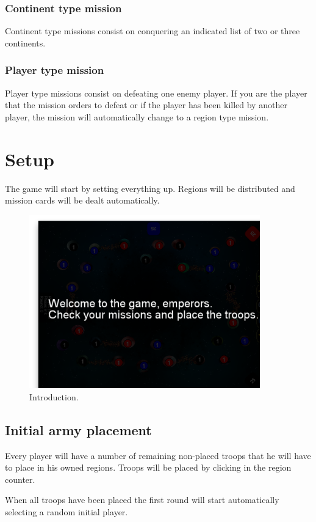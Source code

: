 \documentclass[12pt,a4paper]{article}
\begin{document}
\subsubsection{Continent type mission}
Continent type missions consist on conquering an indicated list of two or three continents.

\subsubsection{Player type mission}
Player type missions consist on defeating one enemy player. If you are the player that the mission orders to defeat or if the player has been killed by another player, the mission will automatically change to a region type mission.

\section{Setup}
The game will start by setting everything up. Regions will be distributed and mission cards will be dealt automatically.

\begin{figure}[h!]
\centering
\includegraphics[width=10cm]{pic/screenshot01.png}
\caption{Introduction.}
\label{fig:setup}
\end{figure}

\subsection{Initial army placement}
Every player will have a number of remaining non-placed troops that he will have to place in his owned regions. Troops will be placed by clicking in the region counter. 

When all troops have been placed the first round will start automatically selecting a random initial player.
\end{document}
